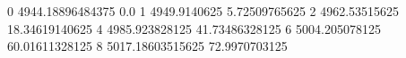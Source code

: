 0 4944.18896484375 0.0
1 4949.9140625 5.72509765625
2 4962.53515625 18.34619140625
4 4985.923828125 41.73486328125
6 5004.205078125 60.01611328125
8 5017.18603515625 72.9970703125
